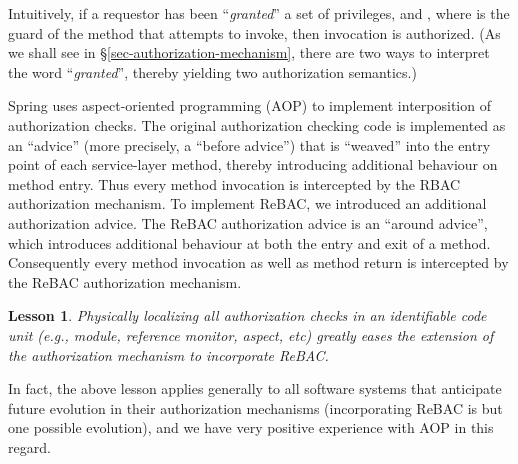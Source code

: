 \documentclass{acm_proc_article-sp}
\newtheorem{lesson}{Lesson}
\begin{document}
Intuitively, if a requestor  has been ``\emph{granted}'' a set 
of privileges, and , where  is the guard of the method
that  attempts to invoke, then invocation is authorized.  (As we
shall see in \S \ref{sec-authorization-mechanism}, there are two ways
to interpret the word ``\emph{granted}'', thereby yielding two
authorization semantics.)


Spring uses aspect-oriented programming (AOP)
\cite{Kiczales-etal:1997} to implement interposition of authorization
checks.  The original authorization checking code is implemented as an
``advice'' (more precisely, a ``before advice'') that is ``weaved''
into the entry point of each service-layer method, thereby introducing
additional behaviour on method entry.  Thus every method invocation is
intercepted by the RBAC authorization mechanism.  To implement ReBAC,
we introduced an additional authorization advice.  The ReBAC
authorization advice is an ``around advice'', which introduces
additional behaviour at both the entry and exit of a method.
Consequently every method invocation as well as method return is
intercepted by the ReBAC authorization mechanism.

\begin{lesson}
  Physically localizing all authorization checks in an identifiable
  code unit (e.g., module, reference monitor, aspect, etc) greatly
  eases the extension of the authorization mechanism to incorporate
  ReBAC.
\end{lesson}

In fact, the above lesson applies generally to all software systems
that anticipate future evolution in their authorization mechanisms
(incorporating ReBAC is but one possible evolution), and we have very
positive experience with AOP in this regard.
\end{document}
